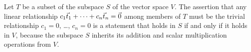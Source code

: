 \begin{exercises}
\begin{answer}
      Let \( T \) be a subset of the subspace \( S \) of the vector space
      \( V \).
      The assertion that any linear relationship 
      $c_1\vec{t}_1+\dots+c_n\vec{t}_n=\vec{0}$ among members of \( T \)
      must be the trivial relationship $c_1=0$, \ldots, $c_n=0$
      is a statement that 
      holds in \( S \) if and only if it holds in \( V \),
      because the subspace \( S \) inherits its addition and 
      scalar multiplication operations from \( V \).  
    \end{answer}
\end{exercises}
